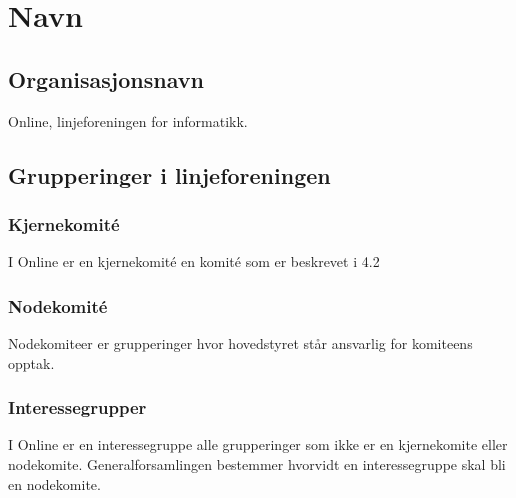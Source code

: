 \chapter{Navn}
\section{Organisasjonsnavn}
\vspace{23pt}
Online, linjeforeningen for informatikk.




\section{Grupperinger i linjeforeningen}
\vspace{23pt}

\subsection{Kjernekomité}

I Online er en kjernekomité en komité som er beskrevet i 4.2

\subsection{Nodekomité}

Nodekomiteer er grupperinger hvor hovedstyret står ansvarlig for komiteens opptak.


\subsection{Interessegrupper}

I Online er en interessegruppe alle grupperinger som ikke er en kjernekomite eller nodekomite. Generalforsamlingen bestemmer hvorvidt en interessegruppe skal bli en nodekomite.


